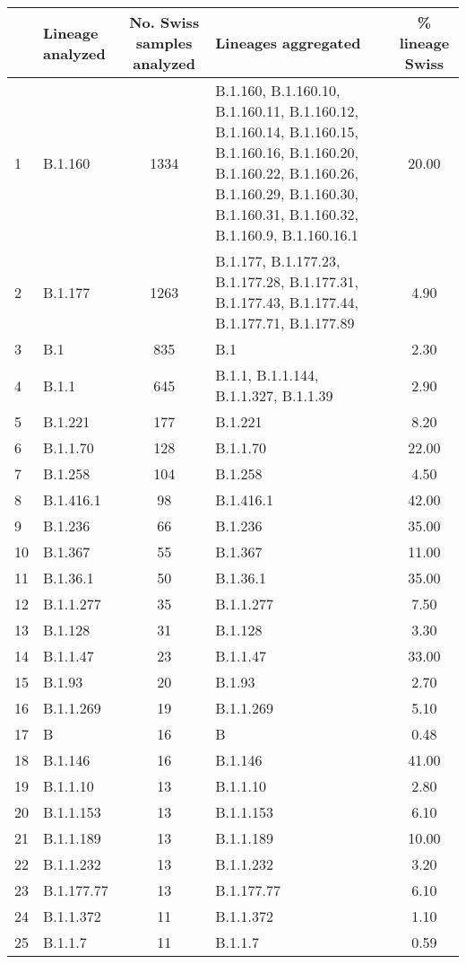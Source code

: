 \begin{longtable}{llcp{4cm}c}
  \hline
 & Lineage analyzed & No. Swiss samples analyzed & Lineages aggregated & \% lineage Swiss \\ 
  \hline
1 & B.1.160 & 1334 & B.1.160, B.1.160.10, B.1.160.11, B.1.160.12, B.1.160.14, B.1.160.15, B.1.160.16, B.1.160.20, B.1.160.22, B.1.160.26, B.1.160.29, B.1.160.30, B.1.160.31, B.1.160.32, B.1.160.9, B.1.160.16.1 & 20.00 \\ 
  2 & B.1.177 & 1263 & B.1.177, B.1.177.23, B.1.177.28, B.1.177.31, B.1.177.43, B.1.177.44, B.1.177.71, B.1.177.89 & 4.90 \\ 
  3 & B.1 & 835 & B.1 & 2.30 \\ 
  4 & B.1.1 & 645 & B.1.1, B.1.1.144, B.1.1.327, B.1.1.39 & 2.90 \\ 
  5 & B.1.221 & 177 & B.1.221 & 8.20 \\ 
  6 & B.1.1.70 & 128 & B.1.1.70 & 22.00 \\ 
  7 & B.1.258 & 104 & B.1.258 & 4.50 \\ 
  8 & B.1.416.1 &  98 & B.1.416.1 & 42.00 \\ 
  9 & B.1.236 &  66 & B.1.236 & 35.00 \\ 
  10 & B.1.367 &  55 & B.1.367 & 11.00 \\ 
  11 & B.1.36.1 &  50 & B.1.36.1 & 35.00 \\ 
  12 & B.1.1.277 &  35 & B.1.1.277 & 7.50 \\ 
  13 & B.1.128 &  31 & B.1.128 & 3.30 \\ 
  14 & B.1.1.47 &  23 & B.1.1.47 & 33.00 \\ 
  15 & B.1.93 &  20 & B.1.93 & 2.70 \\ 
  16 & B.1.1.269 &  19 & B.1.1.269 & 5.10 \\ 
  17 & B &  16 & B & 0.48 \\ 
  18 & B.1.146 &  16 & B.1.146 & 41.00 \\ 
  19 & B.1.1.10 &  13 & B.1.1.10 & 2.80 \\ 
  20 & B.1.1.153 &  13 & B.1.1.153 & 6.10 \\ 
  21 & B.1.1.189 &  13 & B.1.1.189 & 10.00 \\ 
  22 & B.1.1.232 &  13 & B.1.1.232 & 3.20 \\ 
  23 & B.1.177.77 &  13 & B.1.177.77 & 6.10 \\ 
  24 & B.1.1.372 &  11 & B.1.1.372 & 1.10 \\ 
  25 & B.1.1.7 &  11 & B.1.1.7 & 0.59 \\ 

\end{longtable}

